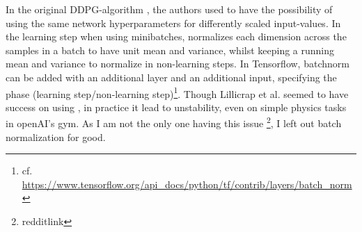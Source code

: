 In the original DDPG-algorithm \cite{lillicrap_continuous_2015}, the authors used  \cite{ioffe_batch_2015} to have the possibility of using the same network hyperparameters for differently scaled input-values. In the learning step when using minibatches, \batchnorm normalizes each dimension across the samples in a batch to have unit mean and variance, whilst keeping a running mean and variance to normalize in non-learning steps. In Tensorflow, batchnorm can be added with an additional layer and an additional input, specifying the phase (learning step/non-learning step)\footnote{cf. \url{https://www.tensorflow.org/api\_docs/python/tf/contrib/layers/batch_norm}}. Though Lillicrap et al. seemed to have success on using \batchnorm, in practice it lead to unstability, even on simple physics tasks in openAI's gym. As I am not the only one having this issue \footnote{redditlink}, I left out batch normalization for good.

